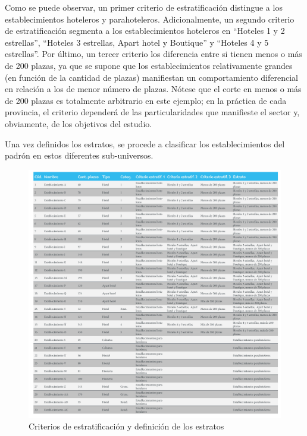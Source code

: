 \documentclass[
]{book}
\begin{document}
Como se puede observar, un primer criterio de estratificación distingue a los establecimientos hoteleros y parahoteleros. Adicionalmente, un segundo criterio de estratificación segmenta a los establecimientos hoteleros en ``Hoteles 1 y 2 estrellas'', ``Hoteles 3 estrellas, Apart hotel y Boutique'' y ``Hoteles 4 y 5 estrellas''. Por último, un tercer criterio los diferencia entre si tienen menos o más de 200 plazas, ya que se supone que los establecimientos relativamente grandes (en función de la cantidad de plazas) manifiestan un comportamiento diferencial en relación a los de menor número de plazas. Nótese que el corte en menos o más de 200 plazas es totalmente arbitrario en este ejemplo; en la práctica de cada provincia, el criterio dependerá de las particularidades que manifieste el sector y, obviamente, de los objetivos del estudio.

Una vez definidos los estratos, se procede a clasificar los establecimientos del padrón en estos diferentes sub-universos.

\begin{figure}

{\centering \includegraphics[width=1\linewidth]{imagenes/tabla_2} 

}

\caption{ Criterios de estratificación y definición de los estratos}\label{fig:criterios-estratos}
\end{figure}
\end{document}
